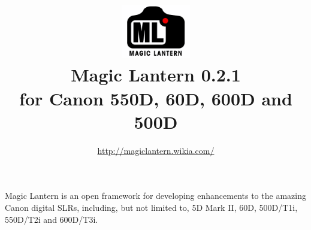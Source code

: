 \documentclass[a4paper,english]{article}
\renewcommand{\href}[2]{\directlua{ShowLink("#1", "#2")}}
\begin{document}
\title{\vspace{-1cm}\includegraphics[width=3cm]{Logo.png}\\Magic Lantern 0.2.1\\{\small for Canon 550D, 60D, 600D and 500D}}
\author{\url{http://magiclantern.wikia.com/}}
\maketitle



Magic Lantern is an open framework for developing enhancements to the amazing Canon digital SLRs, including, but not limited to,
5D Mark II, 60D, 500D/T1i, 550D/T2i and 600D/T3i.
\end{document}
